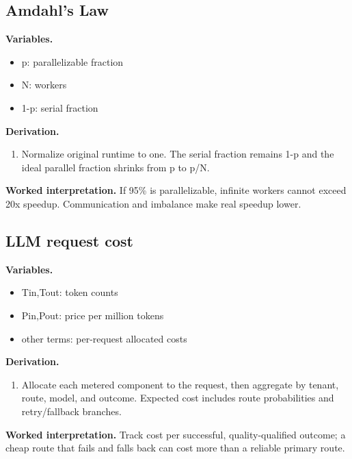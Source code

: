 \subsection{Amdahl's Law}
\textbf{Variables.}\begin{itemize}
\item p: parallelizable fraction
\item N: workers
\item 1-p: serial fraction
\end{itemize}
\textbf{Derivation.}\begin{derivation}\begin{enumerate}
\item Normalize original runtime to one. The serial fraction remains 1-p and the ideal parallel fraction shrinks from p to p/N.
\end{enumerate}\end{derivation}
\textbf{Worked interpretation.} If 95\% is parallelizable, infinite workers cannot exceed 20x speedup. Communication and imbalance make real speedup lower.
\subsection{LLM request cost}
\textbf{Variables.}\begin{itemize}
\item Tin,Tout: token counts
\item Pin,Pout: price per million tokens
\item other terms: per-request allocated costs
\end{itemize}
\textbf{Derivation.}\begin{derivation}\begin{enumerate}
\item Allocate each metered component to the request, then aggregate by tenant, route, model, and outcome. Expected cost includes route probabilities and retry/fallback branches.
\end{enumerate}\end{derivation}
\textbf{Worked interpretation.} Track cost per successful, quality-qualified outcome; a cheap route that fails and falls back can cost more than a reliable primary route.
